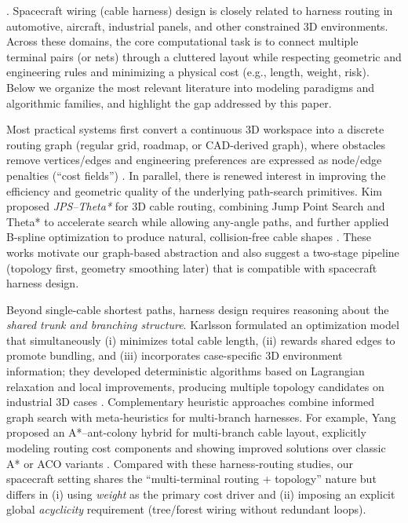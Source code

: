 .
Spacecraft wiring (cable harness) design is closely related to harness routing in automotive, aircraft, industrial panels, and other constrained 3D environments.
Across these domains, the core computational task is to connect multiple terminal pairs (or nets) through a cluttered layout while respecting geometric and engineering rules and minimizing a physical cost (e.g., length, weight, risk).
Below we organize the most relevant literature into modeling paradigms and algorithmic families, and highlight the gap addressed by this paper.

Most practical systems first convert a continuous 3D workspace into a discrete routing graph (regular grid, roadmap, or CAD-derived graph), where obstacles remove vertices/edges and engineering preferences are expressed as node/edge penalties (``cost fields'') \cite{karlsson2024cad}.
In parallel, there is renewed interest in improving the efficiency and geometric quality of the underlying path-search primitives.
Kim \etal{} proposed \emph{JPS--Theta*} for 3D cable routing, combining Jump Point Search and Theta* to accelerate search while allowing any-angle paths, and further applied B-spline optimization to produce natural, collision-free cable shapes \cite{kim2024jpstheta}.
These works motivate our graph-based abstraction and also suggest a two-stage pipeline (topology first, geometry smoothing later) that is compatible with spacecraft harness design.

Beyond single-cable shortest paths, harness design requires reasoning about the \emph{shared trunk and branching structure}.
Karlsson \etal{} formulated an optimization model that simultaneously (i) minimizes total cable length, (ii) rewards shared edges to promote bundling, and (iii) incorporates case-specific 3D environment information; they developed deterministic algorithms based on Lagrangian relaxation and local improvements, producing multiple topology candidates on industrial 3D cases \cite{karlsson2024cad}.
Complementary heuristic approaches combine informed graph search with meta-heuristics for multi-branch harnesses.
For example, Yang \etal{} proposed an A*--ant-colony hybrid for multi-branch cable layout, explicitly modeling routing cost components and showing improved solutions over classic A* or ACO variants \cite{yang2024astaraco}.
Compared with these harness-routing studies, our spacecraft setting shares the ``multi-terminal routing + topology'' nature but differs in (i) using \emph{weight} as the primary cost driver and (ii) imposing an explicit global \emph{acyclicity} requirement (tree/forest wiring without redundant loops).

